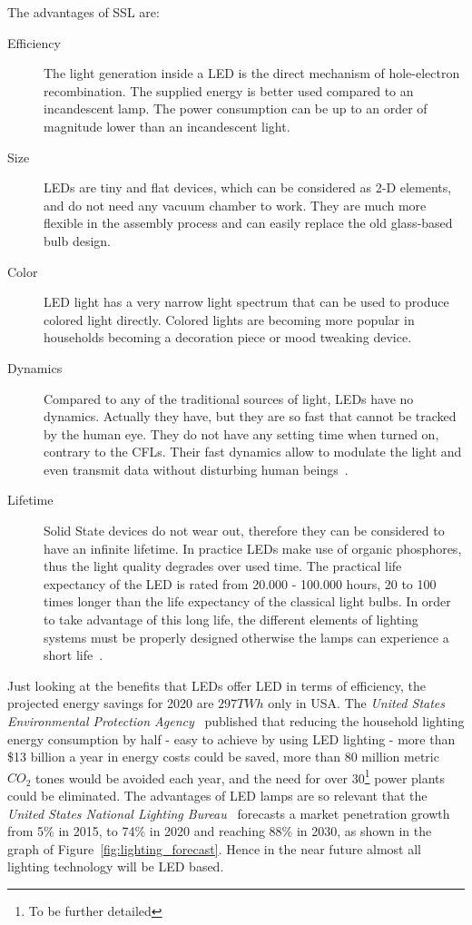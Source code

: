 The advantages of SSL are:
\begin{description}
  \item [Efficiency] The light generation inside a LED is the direct mechanism of hole-electron recombination. The supplied energy is better used compared to an incandescent lamp. The power consumption can be up to an order of magnitude lower than an incandescent light.

  \item [Size] LEDs are tiny and flat devices, which can be considered as 2-D elements,  and do not need any vacuum chamber to work. They are much more flexible in the assembly process and can easily replace the old glass-based bulb design.

  \item [Color] LED light has a very narrow light spectrum that can be used to produce colored light directly. Colored lights are becoming more popular in households becoming a decoration piece or mood tweaking device.

  \item [Dynamics] Compared to any of the traditional sources of light, LEDs have no dynamics. Actually they have, but they are so fast that cannot be tracked by the human eye. They do not have any setting time when turned on, contrary to the CFLs. Their fast dynamics allow to modulate the light and even transmit data without disturbing human beings~\cite{2000Tanaka,2004Komine}.

  \item [Lifetime] Solid State devices do not wear out, therefore they can be considered to have an infinite lifetime. In practice LEDs make use of organic phosphores, thus the light quality degrades over used time. The practical life expectancy of the LED is rated from 20.000 - 100.000 hours, 20 to 100 times longer than the life expectancy of the classical light bulbs. In order to take advantage of this long life, the different elements of lighting systems must be properly designed otherwise the lamps can experience a short life~\cite{2005Narendran}.
\end{description}

Just looking at the benefits that LEDs offer LED in terms of efficiency, the projected energy savings for 2020 are $297TWh$ only in USA. The \emph{United States Environmental Protection Agency}~\cite{14USDoE} published that reducing the household lighting energy consumption by half - easy to achieve by using LED lighting -  more than \$13 billion a year in energy costs could be saved, more than 80 million metric $CO_2$ tones would be avoided each year, and the need for over 30\footnote{To be further detailed} power plants could be eliminated. The advantages of LED lamps are so relevant that the \emph{United States National Lighting Bureau}~\cite{14USDoE} forecasts a market penetration growth from 5\% in 2015, to 74\% in 2020 and reaching 88\% in 2030, as shown in the graph of Figure~\ref{fig:lighting_forecast}. Hence in the near future almost all lighting technology will be LED based.


